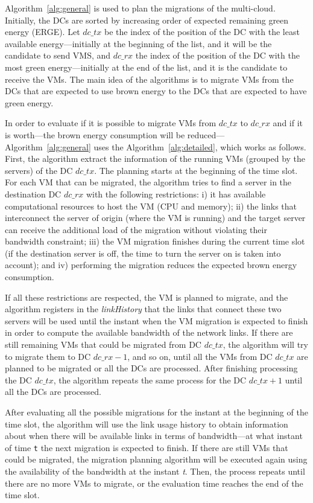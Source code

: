 Algorithm~\ref{alg:general} is used to plan the migrations of the multi-cloud. Initially, the DCs are sorted by increasing order of expected remaining green energy (ERGE). Let $dc\_tx$  be the index of the position of the DC with the least available energy---initially at the beginning of the list, and it will be the candidate to send VMS, and $dc\_rx$ the index of the position of the DC with the most green energy---initially at the end of the list, and it is the candidate to receive the VMs. The main idea of the algorithms is to migrate VMs from the DCs that are expected to use brown energy to the DCs that are expected to have green energy. 

In order to evaluate if it is possible to migrate VMs from $dc\_tx$ to $dc\_rx$ and if it is worth---the brown energy consumption will be reduced---Algorithm~\ref{alg:general} uses the Algorithm~\ref{alg:detailed}, which works as follows. 
First, the algorithm extract the information of the running VMs (grouped by the servers) of the DC $dc\_tx$. The planning starts at the beginning of the time slot. For each VM that can be migrated, the algorithm tries to find a server in the destination DC $dc\_rx$ with the following restrictions: i) it has available computational resources to host the VM (CPU and memory); ii) the links that interconnect the server of origin (where the VM is running) and the target server can receive the additional load of the migration without violating their bandwidth constraint; iii) the VM migration finishes during the current time slot (if the destination server is off, the time to turn the server on is taken into account); and iv) performing the migration reduces the expected brown energy consumption. 

If all these restrictions are respected, the VM is planned to migrate, and the algorithm registers in the \textit{linkHistory} that the links that connect these two servers will be used until the instant when the VM migration is expected to finish in order to compute the available bandwidth of the network links.  If there are still remaining VMs that could be migrated from DC $dc\_tx$, the algorithm will try to migrate them to DC $dc\_rx -1 $, and so on, until all the VMs from DC $dc\_tx$ are planned to be migrated or all the DCs are processed. After finishing processing the DC $dc\_tx$, the algorithm repeats the same process for the DC $dc\_tx +1$ until all the DCs are processed.

After evaluating all the possible migrations for the instant at the beginning of the time slot, the algorithm will use the link usage history to obtain information about when there will be available links in terms of bandwidth---at what instant of time \texttt{t} the next migration is expected to finish.  If there are still VMs that could be migrated, the migration planning algorithm will be executed again using the availability of the bandwidth at the instant \textit{t}. Then, the process repeats until there are no more VMs to migrate, or the evaluation time reaches the end of the time slot.

